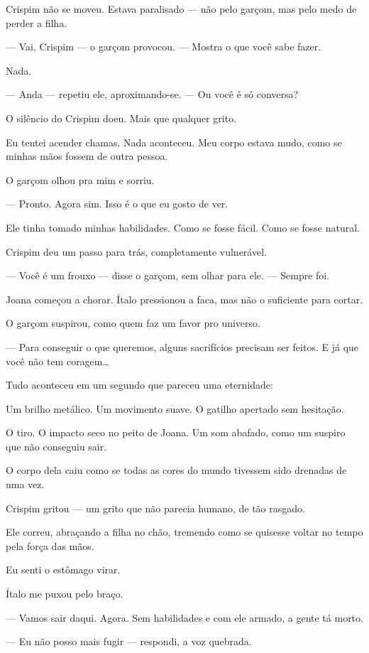Crispim não se moveu.  
Estava paralisado — não pelo garçom, mas pelo medo de perder a filha.

— Vai, Crispim — o garçom provocou. — Mostra o que você sabe fazer.

Nada.

— Anda — repetiu ele, aproximando-se. — Ou você é só conversa?

O silêncio do Crispim doeu.  
Mais que qualquer grito.

Eu tentei acender chamas.  
Nada aconteceu.  
Meu corpo estava mudo, como se minhas mãos fossem de outra pessoa.

O garçom olhou pra mim e sorriu.

— Pronto. Agora sim. Isso é o que eu gosto de ver.

Ele tinha tomado minhas habilidades.  
Como se fosse fácil.  
Como se fosse natural.

Crispim deu um passo para trás, completamente vulnerável.

— Você é um frouxo — disse o garçom, sem olhar para ele. — Sempre foi.

Joana começou a chorar.  
Ítalo pressionou a faca, mas não o suficiente para cortar.

O garçom suspirou, como quem faz um favor pro universo.

— Para conseguir o que queremos, alguns sacrifícios precisam ser feitos.  
E já que você não tem coragem…

Tudo aconteceu em um segundo que pareceu uma eternidade:

Um brilho metálico.  
Um movimento suave.  
O gatilho apertado sem hesitação.

O tiro.  
O impacto seco no peito de Joana.  
Um som abafado, como um suspiro que não conseguiu sair.

O corpo dela caiu como se todas as cores do mundo tivessem sido drenadas de uma vez.

Crispim gritou — um grito que não parecia humano, de tão rasgado.

Ele correu, abraçando a filha no chão, tremendo como se quisesse voltar no tempo pela força das mãos.

Eu senti o estômago virar.

Ítalo me puxou pelo braço.

— Vamos sair daqui. Agora. Sem habilidades e com ele armado, a gente tá morto.

— Eu não posso mais fugir — respondi, a voz quebrada.

